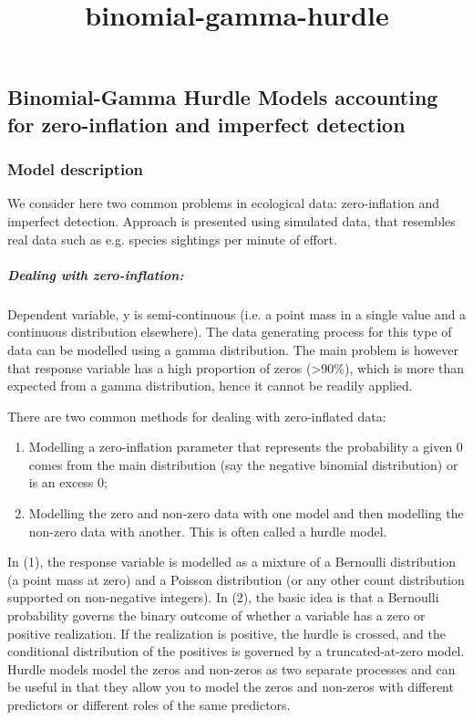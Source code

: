 \documentclass[11pt]{article}
\title{binomial-gamma-hurdle}
\providecommand{\tightlist}{%
      \setlength{\itemsep}{0pt}\setlength{\parskip}{0pt}}
\begin{document}
    
    
    \maketitle
    
    

    
    \subsection{Binomial-Gamma Hurdle Models accounting for zero-inflation
and imperfect
detection}\label{binomial-gamma-hurdle-models-accounting-for-zero-inflation-and-imperfect-detection}

    \subsubsection{Model description}\label{model-description}

We consider here two common problems in ecological data: zero-inflation
and imperfect detection. Approach is presented using simulated data,
that resembles real data such as e.g. species sightings per minute of
effort.

\subparagraph{Dealing with
zero-inflation:}\label{dealing-with-zero-inflation}

Dependent variable, y is semi-continuous (i.e. a point mass in a single
value and a continuous distribution elsewhere). The data generating
process for this type of data can be modelled using a gamma
distribution. The main problem is however that response variable has a
high proportion of zeros (\textgreater{}90\%), which is more than
expected from a gamma distribution, hence it cannot be readily applied.

There are two common methods for dealing with zero-inflated data:

\begin{enumerate}
\def\labelenumi{(\arabic{enumi})}
\tightlist
\item
  Modelling a zero-inflation parameter that represents the probability a
  given 0 comes from the main distribution (say the negative binomial
  distribution) or is an excess 0;
\item
  Modelling the zero and non-zero data with one model and then modelling
  the non-zero data with another. This is often called a hurdle model.
\end{enumerate}

In (1), the response variable is modelled as a mixture of a Bernoulli
distribution (a point mass at zero) and a Poisson distribution (or any
other count distribution supported on non-negative integers). In (2),
the basic idea is that a Bernoulli probability governs the binary
outcome of whether a variable has a zero or positive realization. If the
realization is positive, the hurdle is crossed, and the conditional
distribution of the positives is governed by a truncated-at-zero model.
Hurdle models model the zeros and non-zeros as two separate processes
and can be useful in that they allow you to model the zeros and
non-zeros with different predictors or different roles of the same
predictors.
\end{document}
